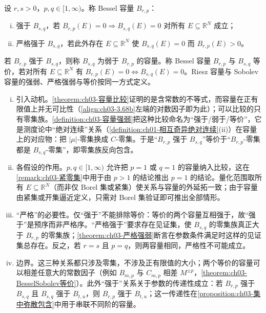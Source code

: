\documentclass[../../main.tex]{subfiles}%
\begin{document}
\begin{definition}\label{definition:ch03-容量强弱}
设 $r,s>0$，$p,q\in[1,\infty)$。称 Bessel 容量 $B_{r,p}$：
\begin{enumerate}[(i)]
\item 强于 $B_{s,q}$，若 $B_{r,p}(E)=0\Rightarrow B_{s,q}(E)=0$ 对所有 $E\subseteq\mathbb{R}^N$ 成立；
\item 严格强于 $B_{s,q}$，若此外存在 $E\subseteq\mathbb{R}^N$ 使 $B_{s,q}(E)=0$ 而 $B_{r,p}(E)>0$。
\end{enumerate}
若 $B_{r,p}$ 强于 $B_{s,q}$，则称 $B_{s,q}$ 为弱于 $B_{r,p}$ 的容量。称 Bessel 容量 $B_{r,p}$ 与 $B_{s,q}$ 等价，若对所有 $E\subseteq\mathbb{R}^N$ 有 $B_{r,p}(E)=0\Leftrightarrow B_{s,q}(E)=0$。Riesz 容量与 Sobolev 容量的强弱、严格强弱与等价按同一方式定义。
\end{definition}

\begin{remark}\label{remark:ch03-容量强弱动机}
\begin{enumerate}[(i)]
\item 引入动机。\cref{theorem:ch03-容量比较}证明的是含常数的不等式，而容量在正有限值上并无可比性（\eqref{align:ch03-3.68b}左端的对数因子即为此）；可以比较的只有零集族。\cref{definition:ch03-容量强弱}把这种比较命名为“强于/弱于/等价”，它是测度论中“绝对连续”关系（\cref{definition:ch01-相互奇异绝对连续}(ii)）在容量上的对应物：把 $|\mu|$-零集换成 $C$-零集。于是“$B_{r,p}$ 强于 $B_{s,q}$”等价于“$B_{r,p}$-零集都是 $B_{s,q}$-零集”，即零集族反向包含。
\item 各假设的作用。$p,q\in[1,\infty)$ 允许把 $p=1$ 或 $q=1$ 的容量纳入比较，这在\cref{remark:ch03-紧零集}中用于由 $p>1$ 的结论推出 $p=1$ 的结论。量化范围取所有 $E\subseteq\mathbb{R}^N$（而非仅 Borel 集或紧集）使关系与容量的外延拓一致；由于容量由紧集或开集逼近定义，只需对 Borel 集验证即可推出全部情形。
\item “严格”的必要性。仅“强于”不能排除等价：等价的两个容量互相强于，故“强于”是预序而非严格序。“严格强于”要求存在见证集，使 $B_{s,q}$ 的零集族真正大于 $B_{r,p}$ 的零集族；\cref{theorem:ch03-严格强弱}断言在参数条件满足时这样的见证集总存在。反之，若 $r=s$ 且 $p=q$，则两容量相同，严格性不可能成立。
\item 边界。这三种关系都只涉及零集，不涉及正有限值的大小；两个等价的容量可以相差任意大的常数因子（例如 $B_{m,p}$ 与 $C_{m,p}$ 相差 $M^{\pm p}$，\cref{theorem:ch03-BesselSobolev等价}）。此外“强于”关系关于参数的传递性成立：若 $B_{r,p}$ 强于 $B_{s,q}$ 且 $B_{s,q}$ 强于 $B_{t,u}$，则 $B_{r,p}$ 强于 $B_{t,u}$；这一传递性在\cref{proposition:ch03-集中弥散包含}中用于串联不同阶的容量。
\end{enumerate}
\end{remark}
\end{document}
